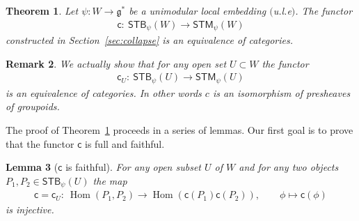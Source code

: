 \documentclass[10pt,a4paper]{amsart}
\numberwithin{equation}{section}
\newtheorem{Lemma}{Lemma}[section]
\newtheorem{Theorem}[Lemma]{Theorem}
\newtheorem{Remark}[Lemma]{Remark}
\begin{document}
\begin{Theorem}\label{thm:iso}
Let $\psi\colon W\to{\mathfrak g}^*$ be a unimodular local embedding $($u.l.e$)$.  The functor
\begin{gather*}
{\textsf{c}}\colon \  {\textsf{STB}}_\psi(W)\to {\textsf{STM}}_\psi (W)
\end{gather*}
constructed in Section~{\rm \ref{sec:collapse}} is an equivalence of
categories.
\end{Theorem}
\begin{Remark}
We actually show that for any open set $U\subset W$ the functor
\begin{gather*}
{\textsf{c}}_U\colon \  {\textsf{STB}}_\psi(U)\to {\textsf{STM}}_\psi (U)
\end{gather*}
is an equivalence of categories.  In other words $c$ is an isomorphism
of presheaves of groupoids.
\end{Remark}



  The proof of Theorem~\ref{thm:iso} proceeds in a series of lemmas.
Our f\/irst goal is to
  prove that the functor ${\textsf{c}}$ is full and faithful.

\begin{Lemma}[${\textsf{c}}$ is faithful] \label{lem4:1}
  For any open subset $U$ of $W$ and for any two objects $P_1, P_2 \in
  {\textsf{STB}}_\psi (U)$ the map
\begin{gather*}
{\textsf{c}}= {\textsf{c}}_U \colon  \ \operatorname{Hom}(P_1, P_2) \to \operatorname{Hom}({\textsf{c}}(P_1) {\textsf{c}}(P_2)), \qquad \phi\mapsto {\textsf{c}}(\phi)
\end{gather*}
is injective.
\end{Lemma}
\end{document}
